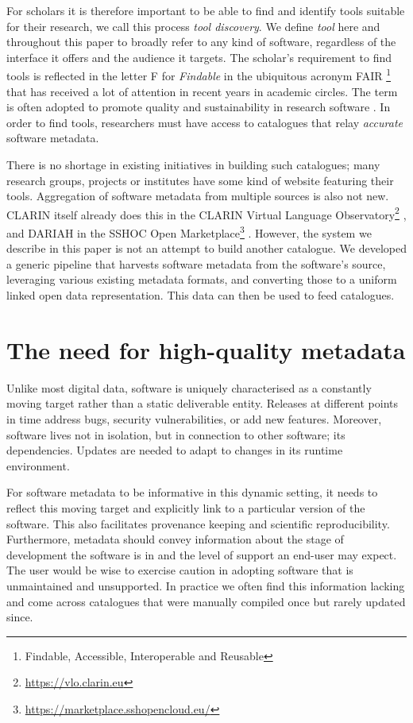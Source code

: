 \documentclass[a4paper,11pt]{article}
\begin{document}
For scholars it is therefore important to be able to find and identify tools suitable for
their research, we call this process \emph{tool discovery}. We define
\emph{tool} here and throughout this paper to broadly refer to any kind of
software, regardless of the interface it offers and the audience it targets.
The scholar's requirement to find tools is reflected in the letter \textsc{F}
for \emph{Findable} in the ubiquitous acronym \textsc{FAIR} \footnote{Findable,
Accessible, Interoperable and Reusable} that has received a lot of attention in
recent years in academic circles. The term is often adopted to promote quality and
sustainability in research software \citep{FAIR}. In order to find tools,
researchers must have access to catalogues that relay \emph{accurate} software
metadata.

There is no shortage in existing initiatives in building such catalogues; many
research groups, projects or institutes have some kind of website featuring
their tools. Aggregation of software metadata from multiple sources is also not
new. CLARIN itself already does this in the CLARIN Virtual Language
Observatory\footnote{\url{https://vlo.clarin.eu}} \citep{VLO}, and DARIAH in
the SSHOC Open Marketplace\footnote{\url{https://marketplace.sshopencloud.eu/}}
. However, the system we describe in this paper is not an attempt to build
another catalogue. We developed a generic pipeline that harvests software
metadata from the software's source, leveraging various existing metadata
formats, and converting those to a uniform linked open data representation.
This data can then be used to feed catalogues.

\section{The need for high-quality metadata}

Unlike most digital data, software is uniquely characterised as a constantly
moving target rather than a static deliverable entity. Releases at different
points in time address bugs, security vulnerabilities, or add new features.
Moreover, software lives not in isolation, but in connection to other software;
its dependencies. Updates are needed to adapt to changes in its runtime
environment.

For software metadata to be informative in this dynamic setting, it needs to
reflect this moving target and explicitly link to a particular version of the
software. This also facilitates provenance keeping and scientific
reproducibility. Furthermore, metadata should convey information about the stage of
development the software is in and the level of support an end-user may expect.
The user would be wise to exercise caution in adopting software that is
unmaintained and unsupported. In practice we often find this information
lacking and come across catalogues that were manually compiled once but rarely
updated since.
\end{document}
